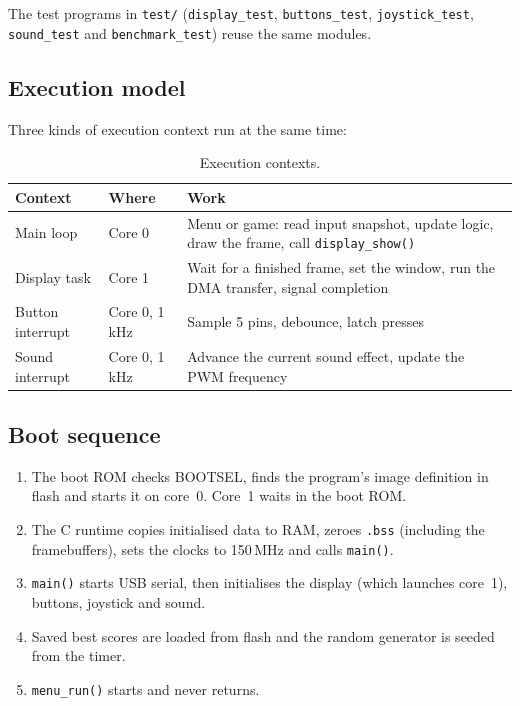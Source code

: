 \documentclass[11pt,a4paper]{article}
\newcommand{\file}[1]{\texttt{#1}}
\begin{document}
\noindent The test programs in \file{test/} (\texttt{display\_test},
\texttt{buttons\_test}, \texttt{joystick\_test}, \texttt{sound\_test} and
\texttt{benchmark\_test}) reuse the same modules.

\subsection{Execution model}
Three kinds of execution context run at the same time:

\begin{table}[H]
\centering
\caption{Execution contexts.}\label{tab:contexts}
\begin{tabularx}{\linewidth}{llX}
\toprule
\textbf{Context} & \textbf{Where} & \textbf{Work} \\
\midrule
Main loop & Core 0 & Menu or game: read input snapshot, update logic, draw the frame, call \texttt{display\_show()} \\
Display task & Core 1 & Wait for a finished frame, set the window, run the DMA transfer, signal completion \\
Button interrupt & Core 0, 1\,kHz & Sample 5 pins, debounce, latch presses \\
Sound interrupt & Core 0, 1\,kHz & Advance the current sound effect, update the PWM frequency \\
\bottomrule
\end{tabularx}
\end{table}

\subsection{Boot sequence}
\begin{enumerate}
  \item The boot ROM checks BOOTSEL, finds the program's image definition in flash and starts it on core~0. Core~1 waits in the boot ROM.
  \item The C runtime copies initialised data to RAM, zeroes \texttt{.bss} (including the framebuffers), sets the clocks to 150\,MHz and calls \texttt{main()}.
  \item \texttt{main()} starts USB serial, then initialises the display (which launches core~1), buttons, joystick and sound.
  \item Saved best scores are loaded from flash and the random generator is seeded from the timer.
  \item \texttt{menu\_run()} starts and never returns.
\end{enumerate}
\end{document}
